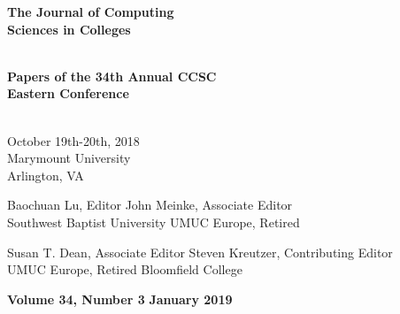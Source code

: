 \begin{textsf}

\begin{center}
\textbf{\Huge{
The Journal of Computing\\
Sciences in Colleges\\
}}\\
\end{center}

\vspace{10pt}
\vspace{10pt}
\vspace{10pt}

\begin{center}
\textbf{\Large{
Papers of the 34th Annual CCSC\\
Eastern Conference\\
}}\\
\end{center}

\vspace{10pt}

\begingroup
\centering
\large{October 19th-20th, 2018}\\
\large{Marymount University}\\
\large{Arlington, VA}\\
\endgroup

\vfill

{\parindent0pt
Baochuan Lu, Editor \hfill John Meinke, Associate Editor\\
Southwest Baptist University \hfill UMUC Europe, Retired\\
}

\vspace{10pt}

{\parindent0pt
Susan T. Dean, Associate Editor \hfill Steven Kreutzer, Contributing Editor\\
UMUC Europe, Retired \hfill Bloomfield College\\
}

\vspace{10pt}

{\parindent0pt
\textbf{\Large Volume 34, Number 3} \hfill \textbf{\Large January 2019}\\
}
\end{textsf}
